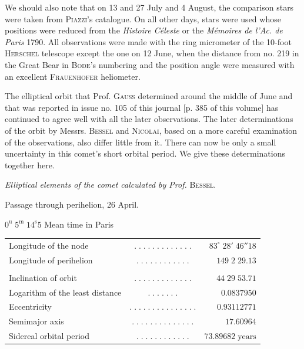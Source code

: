 \par\indent We should also note that on 13 and 27 July and 4 August, the comparison stars were taken from \textsc{Piazzi}’s catalogue. On all other days, stars were used whose positions were reduced from the \emph{Histoire Céleste} or the \emph{Mémoires de l’Ac. de Paris} 1790. All observations were made with the ring micrometer of the 10-foot \textsc{Herschel} telescope except the one on 12 June, when the distance from no. 219 in the Great Bear in \textsc{Bode}’s numbering and the position angle were measured with an excellent \textsc{Frauenhofer} heliometer.

\par\indent The elliptical orbit that Prof. \textsc{Gauss} determined around the middle of June and that was reported in issue no. 105 of this journal [p. 385 of this volume] has continued to agree well with all the later observations. The later determinations of the orbit by Messrs. \textsc{Bessel} and \textsc{Nicolai}, based on a more careful examination of the observations, also differ little from it. There can now be only a small uncertainty in this comet’s short orbital period. We give these determinations together here.

\begin{center}
\emph{Elliptical elements of the comet calculated by Prof.} \textsc{Bessel.}
\end{center}

\begin{center}\fontsize{10}{12}\selectfont Passage through perihelion, 26 April.\par $0^{\mathrm u}\;5^{\mathrm m}\;14^{\mathrm s}5$ Mean time in Paris\end{center}
\begin{center}\fontsize{9}{11}\selectfont\setlength{\tabcolsep}{2pt}\renewcommand{\arraystretch}{1.15}\begin{tabular}{lcr}
Longitude of the node & $.\;.\;.\;.\;.\;.\;.\;.\;.\;.\;.\;.\;.$ & $83^\circ\;28'\;46''18$\\
Longitude of perihelion & $.\;.\;.\;.\;.\;.\;.\;.\;.\;.\;.\;.$ & $149\;2\;29.13$\\
\\
Inclination of orbit & $.\;.\;.\;.\;.\;.\;.\;.\;.\;.\;.\;.\;.$ & $44\;29\;53.71$\\
Logarithm of the least distance & $.\;.\;.\;.\;.\;.\;.$ & $0.0837950$\\
Eccentricity & $.\;.\;.\;.\;.\;.\;.\;.\;.\;.\;.\;.\;.\;.\;.$ & $0.93112771$\\
Semimajor axis & $.\;.\;.\;.\;.\;.\;.\;.\;.\;.\;.\;.\;.\;.$ & $17.60964$\\
Sidereal orbital period & $.\;.\;.\;.\;.\;.\;.\;.\;.\;.\;.\;.$ & $73.89682\;\text{years}$\\
\end{tabular}\end{center}

